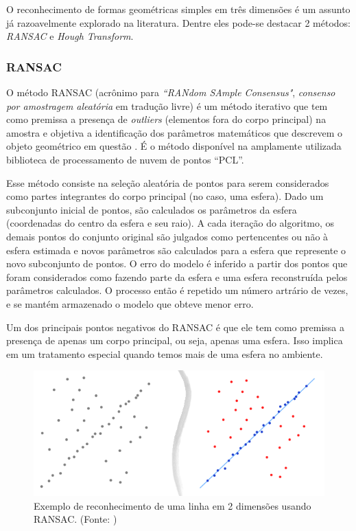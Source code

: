 O reconhecimento de formas geométricas simples em três dimensões é um assunto
já razoavelmente explorado na literatura. Dentre eles pode-se destacar 2
métodos: \textit{RANSAC} e \textit{Hough Transform}.

\subsubsection{RANSAC}
O método RANSAC (acrônimo para \textit{``RANdom SAmple Consensus"},
\textit{consenso por amostragem aleatória} em tradução livre) é um método iterativo que tem como
premissa a presença de \textit{outliers} (elementos fora do corpo principal) na
amostra e objetiva a identificação dos parâmetros matemáticos que descrevem o
objeto geométrico em questão \cite{ransac}. É o método
disponível na amplamente utilizada biblioteca de processamento de nuvem de pontos ``PCL''. 


Esse método consiste na seleção aleatória de pontos para serem considerados como
partes integrantes do corpo principal (no caso, uma esfera). Dado um subconjunto
inicial de pontos, são calculados os parâmetros da esfera (coordenadas do centro
da esfera e seu raio). A cada iteração do algoritmo, os demais pontos do
conjunto original são julgados como pertencentes ou não à esfera estimada e
novos parâmetros são calculados para a esfera que represente o novo subconjunto
de pontos. O erro do modelo é inferido
a partir dos pontos que foram considerados como fazendo parte da esfera e uma esfera reconstruída pelos parâmetros calculados. O processo
então é repetido um número artrário de vezes, e se mantém armazenado o modelo
que obteve menor erro.

Um dos principais pontos negativos do RANSAC é que ele tem como premissa a
presença de apenas um corpo principal, ou seja, apenas uma esfera. Isso implica
em um tratamento especial quando temos mais de uma esfera no ambiente.

\begin{figure}[h!]
   \centering
   \includegraphics[width=0.95\columnwidth]{figs/calibracao/ransac}
   \caption{Exemplo de reconhecimento de uma linha em 2 dimensões usando
   RANSAC. (Fonte: \cite{ransac})}
   \label{fig::ransac}
\end{figure}
 
